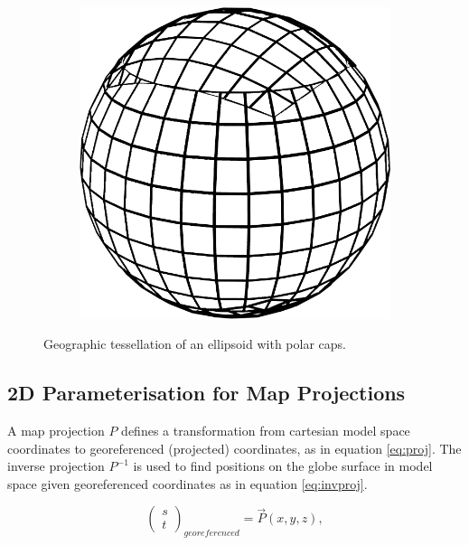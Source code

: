 \begin{figure}
\begin{subfigure}[b]{0.2\textwidth}
    \end{subfigure}
    ~ %
    \begin{subfigure}[b]{0.2\textwidth}
        \includegraphics[width=\textwidth]{figures/tessellation/tessellation_caps_proj3.png}
    \end{subfigure}
    \caption{Geographic tessellation of an ellipsoid with polar caps.}
    \label{fig:tesselation_caps}
\end{figure}

\subsection{2D Parameterisation for Map Projections}

A map projection $P$ defines a transformation from cartesian model space coordinates to georeferenced (projected) coordinates, as in equation \ref{eq:proj}. The inverse projection $P^{-1}$ is used to find positions on the globe surface in model space given georeferenced coordinates as in equation \ref{eq:invproj}.

\begin{equation}
\label{eq:proj}
\begin{pmatrix} s  \\ t  \end{pmatrix}_{ georeferenced }=\vec { P } (x,y,z),
\end{equation}

